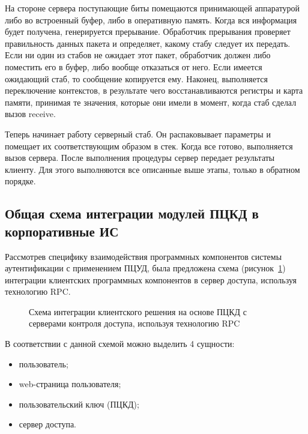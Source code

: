 На стороне сервера поступающие биты помещаются принимающей аппаратурой либо во
встроенный буфер, либо в оперативную память. Когда вся информация будет
получена, генерируется прерывание. Обработчик прерывания проверяет правильность
данных пакета и определяет, какому стабу следует их передать. Если ни один из
стабов не ожидает этот пакет, обработчик должен либо поместить его в буфер, либо
вообще отказаться от него. Если имеется ожидающий стаб, то сообщение копируется
ему. Наконец, выполняется переключение контекстов, в результате чего
восстанавливаются регистры и карта памяти, принимая те значения, которые они
имели в момент, когда стаб сделал вызов receive.

Теперь начинает работу серверный стаб. Он распаковывает параметры и помещает их
соответствующим образом в стек. Когда все готово, выполняется вызов сервера.
После выполнения процедуры сервер передает результаты клиенту. Для этого
выполняются все описанные выше этапы, только в обратном порядке.

\subsection{Общая схема интеграции модулей ПЦКД в корпоративные ИС}

Рассмотрев специфику взаимодействия программных компонентов системы
аутентификации с применением ПЦУД, была предложена схема (рисунок~\ref{ris:3.4.2})
интеграции клиентских программных компонентов в сервер доступа, используя технологию RPC.

\begin{figure}[h!]
\center{\texttt{[image: 3-4-2]}}
\caption{Схема интеграции клиентского решения на основе ПЦКД с серверами
контроля доступа, используя технологию RPC}
\label{ris:3.4.2}
\end{figure} 

В соответствии с данной схемой можно выделить 4 сущности:
\begin{itemize}
  \item пользователь;
  \item web-страница пользователя;
  \item пользовательский ключ (ПЦКД);
  \item сервер доступа.
\end{itemize}

